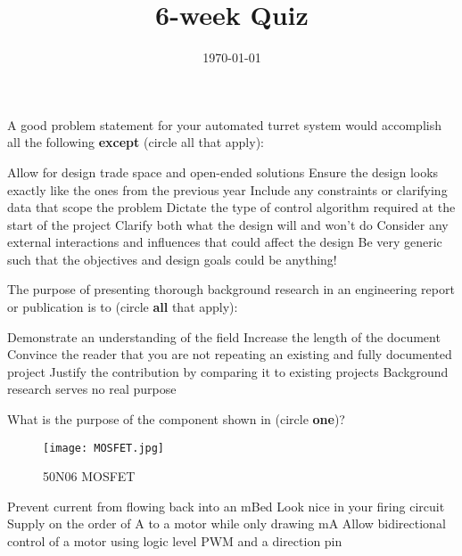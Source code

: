 \documentclass{exam}
\title{6-week Quiz}
\author{\usnaInstructorShort}
\date{\today}
\begin{document}
\maketitle

\begin{questions}
\question
A good problem statement for your automated turret system would accomplish all the following {\bf except} (circle all that apply):
\begin{choices}
\choice Allow for design trade space and open-ended solutions
\choice Ensure the design looks exactly like the ones from the previous year  
\choice Include any constraints or clarifying data that scope the problem
\choice Dictate the type of control algorithm required at the start of the project
\choice Clarify both what the design will and won't do 
\choice Consider any external interactions and influences that could affect the design
\choice Be very generic such that the objectives and design goals could be anything!
\end{choices}





\question
The purpose of presenting thorough background research in an engineering report or publication is to (circle {\bf all} that apply):
\begin{choices}
\choice Demonstrate an understanding of the field
\choice Increase the length of the document 
\choice Convince the reader that you are not repeating an existing and fully documented project
\choice Justify the contribution by comparing it to existing projects
\choice Background research serves no real purpose
\end{choices}




\question
What is the purpose of the component shown in  (circle {\bf one})?
\begin{figure}[h]
\centering
	\texttt{[image: MOSFET.jpg]}
	\caption{50N06 MOSFET}
	\label{fig:MOSFET}
\end{figure}

\begin{choices}
\choice Prevent current from flowing back into an mBed
\choice Look nice in your firing circuit
\choice Supply on the order of A to a motor while only drawing mA
\choice Allow bidirectional control of a motor using logic level PWM and a direction pin
\end{choices}






\end{questions}
\end{document}
